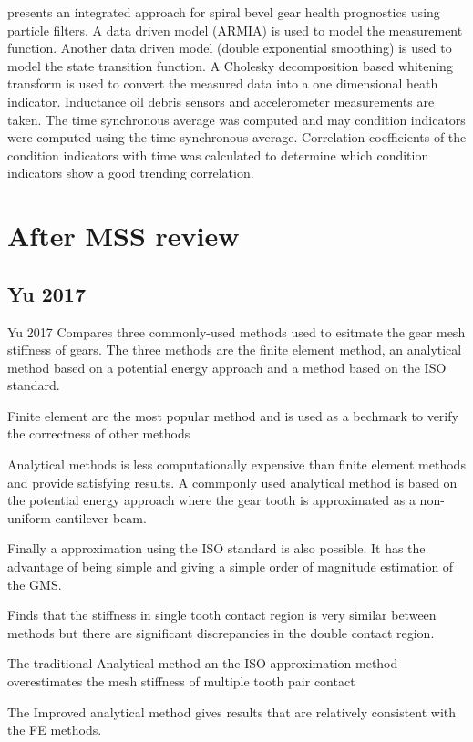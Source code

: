 \cite{He2012} presents an integrated approach for spiral bevel gear health prognostics using particle filters. A data driven model (ARMIA) is used to model the measurement function. Another data driven model (double exponential smoothing) is used to model the state transition function. A Cholesky decomposition based whitening transform is used to convert the measured data into a one dimensional heath indicator. Inductance oil debris sensors and accelerometer measurements are taken. The time synchronous average was computed and may condition indicators were computed using the time synchronous average. Correlation coefficients of the condition indicators with time was calculated to determine which condition indicators show a good trending correlation. 

\section{After MSS review}


\subsection{Yu 2017}
Yu 2017 Compares three commonly-used methods used to esitmate the gear mesh stiffness of gears. The three methods are the finite element method, an analytical method based on a potential energy approach and a method based on the ISO standard. 

Finite element are the most popular method and is used as a bechmark to verify the correctness of other methods

Analytical methods is less computationally expensive than finite element methods and provide satisfying results. A commponly used analytical method is based on the potential energy approach where the gear tooth is approximated as a non-uniform cantilever beam. 

Finally a approximation using the ISO standard is also possible. It has the advantage of being simple and giving a simple order of magnitude estimation of the GMS. 

Finds that the stiffness in single tooth contact region is very similar between methods  but there are significant discrepancies in the double contact region. 

The traditional Analytical method an the ISO approximation method overestimates the mesh stiffness of multiple tooth pair contact

The Improved analytical method gives results that are relatively consistent with the FE methods. 

